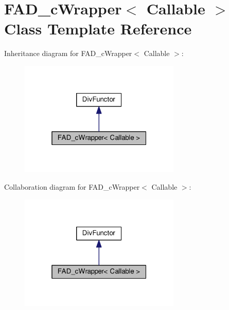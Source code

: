 \hypertarget{classFAD__cWrapper}{}\section{F\+A\+D\+\_\+c\+Wrapper$<$ Callable $>$ Class Template Reference}
\label{classFAD__cWrapper}


Inheritance diagram for F\+A\+D\+\_\+c\+Wrapper$<$ Callable $>$\+:
\nopagebreak
\begin{figure}[H]
\begin{center}
\leavevmode
\includegraphics[width=217pt]{classFAD__cWrapper__inherit__graph}
\end{center}
\end{figure}


Collaboration diagram for F\+A\+D\+\_\+c\+Wrapper$<$ Callable $>$\+:
\nopagebreak
\begin{figure}[H]
\begin{center}
\leavevmode
\includegraphics[width=217pt]{classFAD__cWrapper__coll__graph}
\end{center}
\end{figure}
